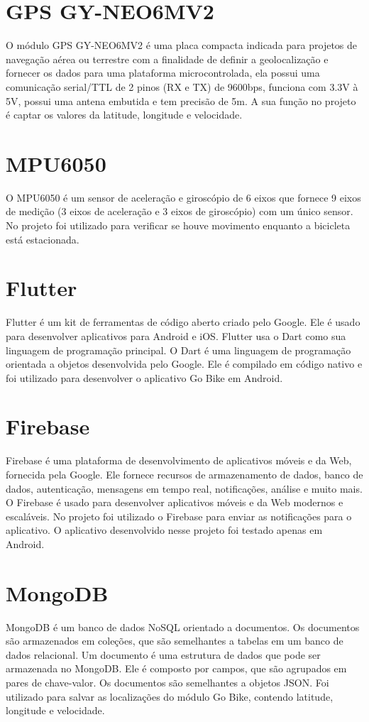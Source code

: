 \section{GPS GY-NEO6MV2}
O módulo GPS GY-NEO6MV2 é uma placa compacta indicada para projetos de navegação aérea ou terrestre com a finalidade de definir a geolocalização e fornecer os dados para uma plataforma microcontrolada, ela possui uma comunicação serial/TTL de 2 pinos (RX e TX) de 9600bps, funciona com 3.3V à 5V, possui uma antena embutida e tem precisão de 5m. A sua função no projeto é captar os valores da latitude, longitude e velocidade.

\section{MPU6050}
O MPU6050 é um sensor de aceleração e giroscópio de 6 eixos que fornece 9 eixos de medição (3 eixos de aceleração e 3 eixos de giroscópio) com um único sensor. No projeto foi utilizado para verificar se houve movimento enquanto a bicicleta está estacionada.

\section{Flutter}
Flutter é um kit de ferramentas de código aberto criado pelo Google. Ele é usado para desenvolver aplicativos para Android e iOS. Flutter usa o Dart como sua linguagem de programação principal. O Dart é uma linguagem de programação orientada a objetos desenvolvida pelo Google. Ele é compilado em código nativo e foi utilizado para desenvolver o aplicativo Go Bike em Android.

\section{Firebase}
Firebase é uma plataforma de desenvolvimento de aplicativos móveis e da Web, fornecida pela Google. Ele fornece recursos de armazenamento de dados, banco de dados, autenticação, mensagens em tempo real, notificações, análise e muito mais. O Firebase é usado para desenvolver aplicativos móveis e da Web modernos e escaláveis. No projeto foi utilizado o Firebase para enviar as notificações para o aplicativo. O aplicativo desenvolvido nesse projeto foi testado apenas em Android.

\section{MongoDB}
MongoDB é um banco de dados NoSQL orientado a documentos. Os documentos são armazenados em coleções, que são semelhantes a tabelas em um banco de dados relacional. Um documento é uma estrutura de dados que pode ser armazenada no MongoDB. Ele é composto por campos, que são agrupados em pares de chave-valor. Os documentos são semelhantes a objetos JSON. Foi utilizado para salvar as localizações do módulo Go Bike, contendo latitude, longitude e velocidade.

